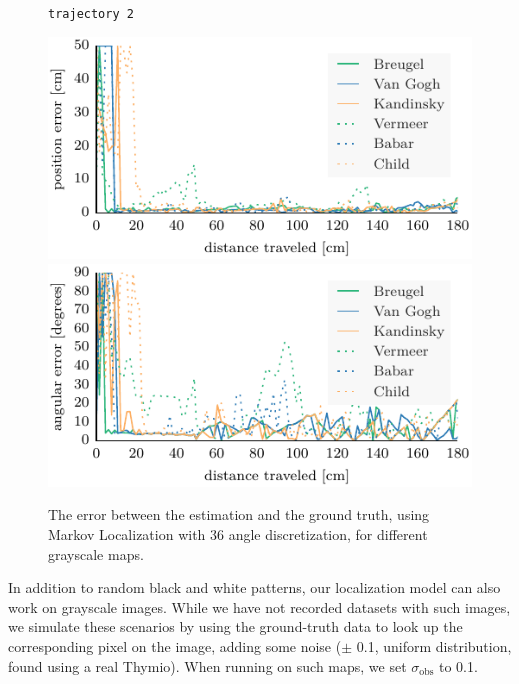 \documentclass[letterpaper, 10pt, conference]{ieeeconf}
\begin{document}
\begin{figure}
\begin{center}
\texttt{trajectory~2}
\end{center}
\vspace{-.3em}
\includegraphics{ml-grayscale_images-random_2-xy}\hfill
\includegraphics{ml-grayscale_images-random_2-theta}

\caption{The error between the estimation and the ground truth, using Markov Localization with 36 angle discretization, for different grayscale maps.}
\label{fig:grayscale}
\end{figure}


In addition to random black and white patterns, our localization model can also work on grayscale images.
While we have not recorded datasets with such images, we simulate these scenarios by using the ground-truth data to look up the corresponding pixel on the image, adding some noise ($\pm$ 0.1, uniform distribution, found using a real Thymio).
When running on such maps, we set $\sigma_\mathrm{obs}$ to 0.1.
\end{document}
